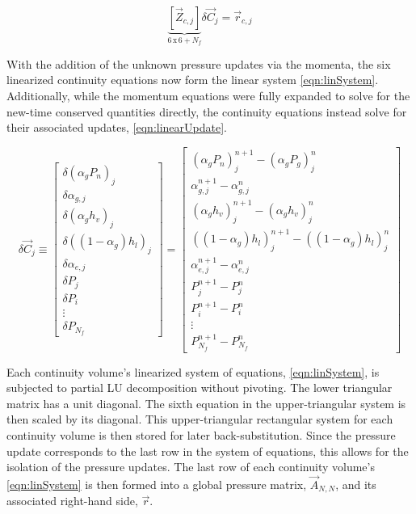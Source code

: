 \begin{equation}
\label{eqn:linSystem}
\underbrace{\left[\vec{Z}_{c, j}\right]}_{6\, \text{x}\, 6 + N_{f}} \delta \vec{C}_{j} = \vec{r}_{c,j}
\end{equation}

With the addition of the unknown pressure updates via the momenta, the six linearized continuity equations now form the linear system \eqref{eqn:linSystem}.
Additionally, while the momentum equations were fully expanded to solve for the new-time conserved quantities directly, the continuity equations instead solve for their associated updates, \eqref{eqn:linearUpdate}.

\begin{equation}
\label{eqn:linearUpdate}
\delta \vec{C}_{j} \equiv 
\begin{bmatrix}
\delta ( \alpha_{g} P_{n} )_j \\
\delta \alpha_{g, j} \\
\delta ( \alpha_{g} h_v )_j \\
\delta ( (1 - \alpha_{g} ) h_l )_j \\
\delta \alpha_{e,j} \\
\delta P_j \\ 
\delta P_i \\
\vdots \\
\delta P_{N_{f}}
\end{bmatrix}
=
\begin{bmatrix}
( \alpha_{g} P_{n})_{j}^{n+1} - (\alpha_{g} P_{g} )_{j}^{n} \\
\alpha^{n+1}_{g,j} - \alpha^{n}_{g,j} \\
( \alpha_{g} h_{v} )_{j}^{n+1} - ( \alpha_{g} h_{v} )_{j}^{n} \\
( ( 1 - \alpha_{g} ) h_{l} )_{j}^{n+1} - ( ( 1 - \alpha_{g} ) h_{l} )_{j}^{n} \\
\alpha^{n+1}_{e,j} - \alpha^{n}_{e,j} \\
 P_{j}^{n+1} - P_{j}^{n} \\
 P_{i}^{n+1} - P_{i}^{n} \\
 \vdots \\
 P_{N_{f}}^{n+1} - P_{N_{f}}^{n}
\end{bmatrix}
\end{equation}

Each continuity volume's linearized system of equations, \eqref{eqn:linSystem}, is subjected to partial LU decomposition without pivoting.
The lower triangular matrix has a unit diagonal.
The sixth equation in the upper-triangular system is then scaled by its diagonal.
This upper-triangular rectangular system for each continuity volume is then stored for later back-substitution.
Since the pressure update corresponds to the last row in the system of equations, this allows for the isolation of the pressure updates.
The last row of each continuity volume's \eqref{eqn:linSystem} is then formed into a global pressure matrix, $\vec{A}_{N,N}$, and its associated right-hand side, $\vec{r}$.

